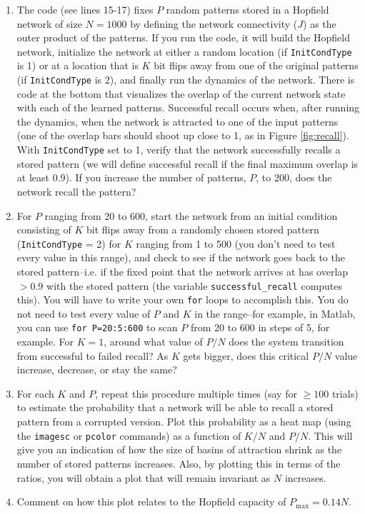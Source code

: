 \documentclass[letterpaper,11pt]{article}
\begin{document}
\begin{enumerate}
  \item The code (see lines 15-17) fixes $P$ random patterns stored in a Hopfield network of size $N=1000$ by defining the network connectivity ($J$) as the outer product of the patterns. If you run the code, it will build the Hopfield network, initialize the network at either a random location (if \texttt{InitCondType} is 1) or at a location that is $K$ bit flips away from one of the original patterns (if \texttt{InitCondType} is 2), and finally run the dynamics of the network. There is code at the bottom that visualizes the overlap of the current network state with each of the learned patterns. Successful recall occurs when, after running the dynamics, when the network is attracted to one of the input patterns (one of the overlap bars should shoot up close to 1, as in Figure \ref{fig:recall}). With \texttt{InitCondType} set to 1, verify that the network successfully recalls a stored pattern (we will define successful recall if the final maximum overlap is at least 0.9). If you increase the number of patterns, $P$, to 200, does the network recall the pattern?
  \item For $P$ ranging from 20 to 600, start the network from an initial condition consisting of $K$ bit flips away from a randomly chosen stored pattern (\texttt{InitCondType} = 2) for $K$ ranging from 1 to 500 (you don't need to test every value in this range), and check to see if the network goes back to the stored pattern--i.e. if the fixed point that the network arrives at has overlap $> 0.9$ with the stored pattern (the variable \texttt{successful\_recall} computes this). You will have to write your own \texttt{for} loops to accomplish this. You do not need to test every value of $P$ and $K$ in the range--for example, in Matlab, you can use \texttt{for P=20:5:600} to scan $P$ from 20 to 600 in steps of 5, for example. For $K=1$, around what value of $P/N$ does the system transition from successful to failed recall? As $K$ gets bigger, does this critical $P/N$ value increase, decrease, or stay the same?
  \item For each $K$ and $P$, repeat this procedure multiple times (say for $\geq 100$ trials) to estimate the probability that a network will be able to recall a stored pattern from a corrupted version. Plot this probability as a heat map (using the \texttt{imagesc} or \texttt{pcolor} commands) as a function of $K/N$ and $P/N$. This will give you an indication of how the size of basins of attraction shrink as the number of stored patterns increases. Also, by plotting this in terms of the ratios, you will obtain a plot that will remain invariant as $N$ increases.
  \item Comment on how this plot relates to the Hopfield capacity of $P_\text{max} = 0.14 N$.
\end{enumerate}
\end{document}

